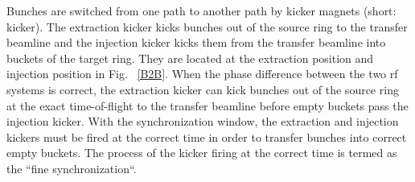 Bunches are switched from one path to another path by kicker magnets (short: kicker). The extraction kicker kicks bunches out of the source ring to the transfer beamline and the injection kicker kicks them from the transfer beamline into buckets of the target ring. They are located at the extraction position and injection position in Fig. ~\ref{B2B}. When the phase difference between the two rf systems is correct, the extraction kicker can kick bunches out of the source ring at the exact time-of-flight to the transfer beamline before empty buckets pass the injection kicker. With the synchronization window, the extraction and injection kickers must be fired at the correct time in order to transfer bunches into correct empty buckets. The process of the kicker firing at the correct time is termed as the ``fine synchronization``.


